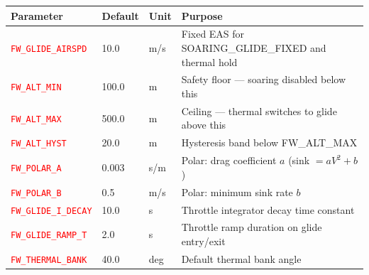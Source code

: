 \documentclass[11pt,a4paper]{article}
\newcommand{\new}[1]{\textcolor{red}{#1}}          %
\begin{document}
\begin{center}
\renewcommand{\arraystretch}{1.3}
\begin{tabular}{lllp{5cm}}
\toprule
Parameter & Default & Unit & Purpose \\
\midrule
\new{\texttt{FW\_GLIDE\_AIRSPD}} & 10.0 & m/s & Fixed EAS for SOARING\_GLIDE\_FIXED and thermal hold \\
\new{\texttt{FW\_ALT\_MIN}} & 100.0 & m & Safety floor — soaring disabled below this \\
\new{\texttt{FW\_ALT\_MAX}} & 500.0 & m & Ceiling — thermal switches to glide above this \\
\new{\texttt{FW\_ALT\_HYST}} & 20.0 & m & Hysteresis band below FW\_ALT\_MAX \\
\new{\texttt{FW\_POLAR\_A}} & 0.003 & s/m & Polar: drag coefficient $a$ (sink $= aV^2+b$) \\
\new{\texttt{FW\_POLAR\_B}} & 0.5 & m/s & Polar: minimum sink rate $b$ \\
\new{\texttt{FW\_GLIDE\_I\_DECAY}} & 10.0 & s & Throttle integrator decay time constant \\
\new{\texttt{FW\_GLIDE\_RAMP\_T}} & 2.0 & s & Throttle ramp duration on glide entry/exit \\
\new{\texttt{FW\_THERMAL\_BANK}} & 40.0 & deg & Default thermal bank angle \\
\bottomrule
\end{tabular}
\end{center}
\end{document}
